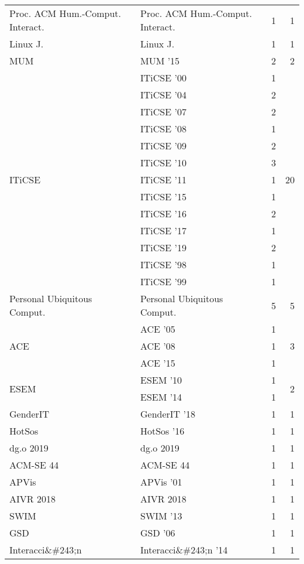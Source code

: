 \begin{table*}[t]
\begin{tabular}{llrr}
\multirow{1}{*}{Proc. ACM Hum.-Comput. Interact.} & Proc. ACM Hum.-Comput. Interact. & 1 & \multirow{1}{*}{1}\\
\multirow{1}{*}{Linux J.} & Linux J. & 1 & \multirow{1}{*}{1}\\
\multirow{1}{*}{MUM } & MUM '15 & 2 & \multirow{1}{*}{2}\\
\multirow{13}{*}{ITiCSE } & ITiCSE '00 & 1 & \multirow{13}{*}{20}\\
& ITiCSE '04 & 2 &\\
& ITiCSE '07 & 2 &\\
& ITiCSE '08 & 1 &\\
& ITiCSE '09 & 2 &\\
& ITiCSE '10 & 3 &\\
& ITiCSE '11 & 1 &\\
& ITiCSE '15 & 1 &\\
& ITiCSE '16 & 2 &\\
& ITiCSE '17 & 1 &\\
& ITiCSE '19 & 2 &\\
& ITiCSE '98 & 1 &\\
& ITiCSE '99 & 1 &\\
\multirow{1}{*}{Personal Ubiquitous Comput.} & Personal Ubiquitous Comput. & 5 & \multirow{1}{*}{5}\\
\multirow{3}{*}{ACE } & ACE '05 & 1 & \multirow{3}{*}{3}\\
& ACE '08 & 1 &\\
& ACE '15 & 1 &\\
\multirow{2}{*}{ESEM } & ESEM '10 & 1 & \multirow{2}{*}{2}\\
& ESEM '14 & 1 &\\
\multirow{1}{*}{GenderIT } & GenderIT '18 & 1 & \multirow{1}{*}{1}\\
\multirow{1}{*}{HotSos } & HotSos '16 & 1 & \multirow{1}{*}{1}\\
\multirow{1}{*}{dg.o 2019} & dg.o 2019 & 1 & \multirow{1}{*}{1}\\
\multirow{1}{*}{ACM-SE 44} & ACM-SE 44 & 1 & \multirow{1}{*}{1}\\
\multirow{1}{*}{APVis } & APVis '01 & 1 & \multirow{1}{*}{1}\\
\multirow{1}{*}{AIVR 2018} & AIVR 2018 & 1 & \multirow{1}{*}{1}\\
\multirow{1}{*}{SWIM } & SWIM '13 & 1 & \multirow{1}{*}{1}\\
\multirow{1}{*}{GSD } & GSD '06 & 1 & \multirow{1}{*}{1}\\
\multirow{1}{*}{Interacci\&\#243;n } & Interacci\&\#243;n '14 & 1 & \multirow{1}{*}{1}\\

\end{tabular}
\end{table*}
